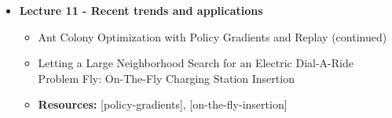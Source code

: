 \documentclass{article}
\begin{document}
\begin{itemize}
    \item \textbf{Lecture 11 - Recent trends and applications}
    \begin{itemize}
        \item Ant Colony Optimization with Policy Gradients and Replay (continued)
        \item Letting a Large Neighborhood Search for an Electric Dial-A-Ride Problem Fly: On-The-Fly Charging Station Insertion
        \item \textbf{Resources:} [policy-gradients], [on-the-fly-insertion]
    \end{itemize}

\end{itemize}
\end{document}
